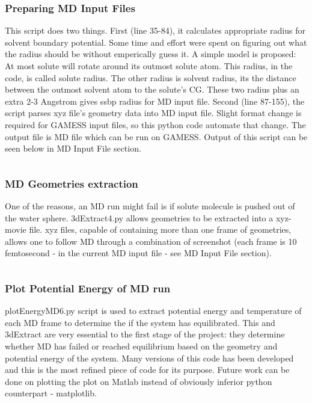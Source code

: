 \documentclass[
journal=jacsat, %
manuscript=article]{achemso}
\begin{document}
		\subsubsection{Preparing MD Input Files}
			This script does two things. First (line 35-84), it calculates appropriate radius for solvent boundary potential. Some time and effort were spent on figuring out what the radius should be without emperically guess it. A simple model is proposed: At most solute will rotate around its outmost solute atom. This radius, in the code, is called solute radius. The other radius is solvent radius, its the distance between the outmost solvent atom to the solute's CG. These two radius plus an extra 2-3 Angstrom gives ssbp radius for MD input file. Second (line 87-155), the script parses xyz file's geometry data into MD input file. Slight format change is required for GAMESS input files, so this python code automate that change. The output file is MD file which can be run on GAMESS. Output of this script can be seen below in MD Input File section.
			\vfill
			\inputminted[linenos, breaklines, baselinestretch=1, fontsize=\small]{python}{../pythonScripts/prepareMD2.py}
		
		\subsubsection{MD Geometries extraction}
			One of the reasons, an MD run might fail is if solute molecule is pushed out of the water sphere. 3dExtract4.py allows geometries to be extracted into a xyz-movie file. xyz files, capable of containing more than one frame of geometries, allows one to follow MD through a combination of screenshot (each frame is 10 femtosecond - in the current MD input file - see MD Input File section). 
			\inputminted[linenos, breaklines, baselinestretch=1, fontsize=\small]{python}{../pythonScripts/3dExtract4.py}
			
		\subsubsection{Plot Potential Energy of MD run}
			plotEnergyMD6.py script is used to extract potential energy and temperature of each MD frame to determine the if the system has equilibrated. This and 3dExtract are very essential to the first stage of the project: they determine whether MD has failed or reached equilibrium based on the geometry and potential energy of the system. Many versions of this code has been developed and this is the most refined piece of code for its purpose. Future work can be done on plotting the plot on Matlab instead of obviously inferior python counterpart - matplotlib. 
			\inputminted[linenos, breaklines, baselinestretch=1, fontsize=\small]{python}{../pythonScripts/plotEnergyMD6.py} 	
		
\end{document}
